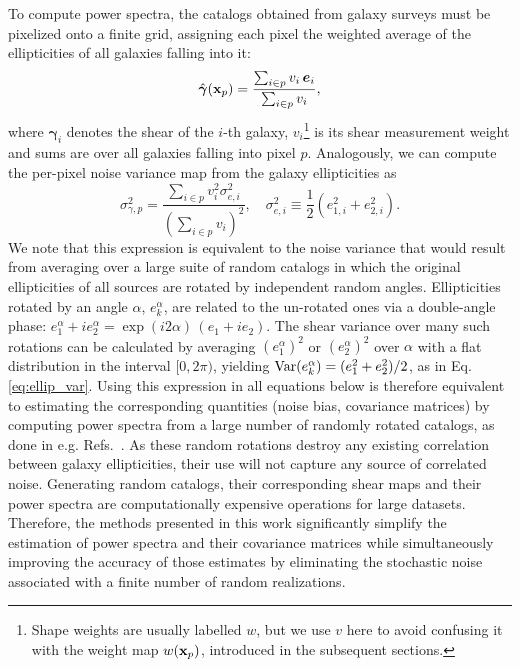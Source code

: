 \documentclass[a4paper,11pt]{article}
\newcommand{\shear}{\boldsymbol{\gamma}}
\newcommand{\ellip}{\boldsymbol{e}}
\begin{document}
        To compute power spectra, the catalogs obtained from galaxy surveys must be pixelized onto a finite grid, assigning each pixel the weighted average of the ellipticities of all galaxies falling into it:
        \begin{equation}\label{eq:shear_map}
        \hat{\shear}({\bf x}_p)=\frac{\sum_{i\in p}v_i\,\ellip_i}{\sum_{i\in p} v_i},
        \end{equation}
        where $\shear_i$ denotes the shear of the $i$-th galaxy, $v_i$\footnote{Shape weights are usually labelled $w$, but we use $v$ here to avoid confusing it with the weight map $w({\bf x}_p)$, introduced in the subsequent sections.} is its shear measurement weight and sums are over all galaxies falling into pixel $p$. Analogously, we can compute the per-pixel noise variance map from the galaxy ellipticities as
        \begin{equation}\label{eq:ellip_var}
        \sigma_{\gamma,p}^2=\frac{\sum_{i\in p} v_i^2\sigma_{e,i}^2}{\left(\sum_{i\in p}v_i\right)^2},\hspace{12pt}
        \sigma_{e,i}^2\equiv\frac{1}{2}(e_{1,i}^2+e_{2,i}^2).
      \end{equation}
      We note that this expression is equivalent to the noise variance that would result from averaging over a large suite of random catalogs in which the original ellipticities of all sources are rotated by independent random angles. Ellipticities rotated by an angle $\alpha$, $e_k^\alpha$, are related to the un-rotated ones via a double-angle phase: $e_1^\alpha+ie^\alpha_2=\exp(i2\alpha)\,(e_1+ie_2)$. The shear variance over many such rotations can be calculated by averaging $(e_1^\alpha)^2$ or $(e_2^\alpha)^2$ over $\alpha$ with a flat distribution in the interval $[0,2\pi)$, yielding ${\rm Var}(e_k^\alpha)=(e_1^2+e_2^2)/2$, as in Eq. \ref{eq:ellip_var}. Using this expression in all equations below is therefore equivalent to estimating the corresponding quantities (noise bias, covariance matrices) by computing power spectra from a large number of randomly rotated catalogs, as done in e.g. Refs.~\cite{1507.05598,1809.09148}. As these random rotations destroy any existing correlation between galaxy ellipticities, their use will not capture any source of correlated noise. Generating random catalogs, their corresponding shear maps and their power spectra are computationally expensive operations for large datasets. Therefore, the methods presented in this work significantly simplify the estimation of power spectra and their covariance matrices while simultaneously improving the accuracy of those estimates by eliminating the stochastic noise associated with a finite number of random realizations.
\end{document}
